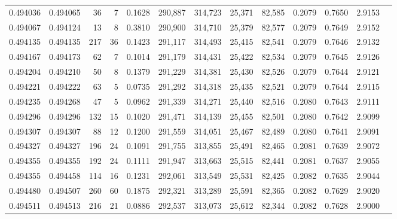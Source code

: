 \begin{tabular}{rrrrrrrrrrrrr}
0.494036 & 0.494065 &    36 &     7 &                                     0.1628 & 290,887 & 314,723 &  25,371 &  82,585 & 0.2079 & 0.7650 & 2.9153 \\
0.494067 & 0.494124 &    13 &     8 &                                     0.3810 & 290,900 & 314,710 &  25,379 &  82,577 & 0.2079 & 0.7649 & 2.9152 \\
0.494135 & 0.494135 &   217 &    36 &                                     0.1423 & 291,117 & 314,493 &  25,415 &  82,541 & 0.2079 & 0.7646 & 2.9132 \\
0.494167 & 0.494173 &    62 &     7 &                                     0.1014 & 291,179 & 314,431 &  25,422 &  82,534 & 0.2079 & 0.7645 & 2.9126 \\
0.494204 & 0.494210 &    50 &     8 &                                     0.1379 & 291,229 & 314,381 &  25,430 &  82,526 & 0.2079 & 0.7644 & 2.9121 \\
0.494221 & 0.494222 &    63 &     5 &                                     0.0735 & 291,292 & 314,318 &  25,435 &  82,521 & 0.2079 & 0.7644 & 2.9115 \\
0.494235 & 0.494268 &    47 &     5 &                                     0.0962 & 291,339 & 314,271 &  25,440 &  82,516 & 0.2080 & 0.7643 & 2.9111 \\
0.494296 & 0.494296 &   132 &    15 &                                     0.1020 & 291,471 & 314,139 &  25,455 &  82,501 & 0.2080 & 0.7642 & 2.9099 \\
0.494307 & 0.494307 &    88 &    12 &                                     0.1200 & 291,559 & 314,051 &  25,467 &  82,489 & 0.2080 & 0.7641 & 2.9091 \\
0.494327 & 0.494327 &   196 &    24 &                                     0.1091 & 291,755 & 313,855 &  25,491 &  82,465 & 0.2081 & 0.7639 & 2.9072 \\
0.494355 & 0.494355 &   192 &    24 &                                     0.1111 & 291,947 & 313,663 &  25,515 &  82,441 & 0.2081 & 0.7637 & 2.9055 \\
0.494355 & 0.494458 &   114 &    16 &                                     0.1231 & 292,061 & 313,549 &  25,531 &  82,425 & 0.2082 & 0.7635 & 2.9044 \\
0.494480 & 0.494507 &   260 &    60 &                                     0.1875 & 292,321 & 313,289 &  25,591 &  82,365 & 0.2082 & 0.7629 & 2.9020 \\
0.494511 & 0.494513 &   216 &    21 &                                     0.0886 & 292,537 & 313,073 &  25,612 &  82,344 & 0.2082 & 0.7628 & 2.9000 \\

\end{tabular}
